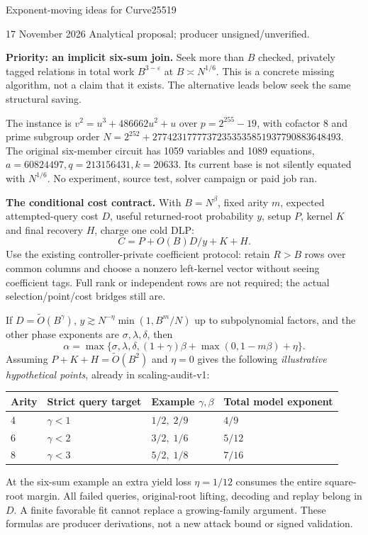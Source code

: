 \documentclass[10pt]{article}
\newcommand{\softO}{\widetilde O}
\begin{document}
{\LARGE Exponent-moving ideas for Curve25519}\par
17 November 2026 \quad Analytical proposal; producer unsigned/unverified.

\textbf{Priority: an implicit six-sum join.} Seek more than $B$ checked,
privately tagged relations in total work $B^{3-\varepsilon}$ at
$B\asymp N^{1/6}$. This is a concrete missing algorithm, not a claim that it
exists. The alternative leads below seek the same structural saving.

The instance is $v^2=u^3+486662u^2+u$ over $p=2^{255}-19$, with cofactor
8 and prime subgroup order
$N=2^{252}+27742317777372353535851937790883648493$.
The original six-member circuit has 1059 variables and 1089 equations,
$a=60824497,q=213156431,k=20633$. Its current base is not silently equated
with $N^{1/6}$. No experiment, source test, solver campaign or paid job ran.

\textbf{The conditional cost contract.} With $B=N^\beta$, fixed arity $m$,
expected attempted-query cost $D$, useful returned-root probability $y$,
setup $P$, kernel $K$ and final recovery $H$, charge one cold DLP:
\[
 C=P+O(B)D/y+K+H.
\]
Use the existing controller-private coefficient protocol: retain $R>B$
rows over common columns and choose a nonzero left-kernel vector without
seeing coefficient tags. Full rank or independent rows are not required;
the actual selection/point/cost bridges still are.

If $D=\softO(B^\gamma)$,
$y\gtrsim N^{-\eta}\min(1,B^m/N)$ up to subpolynomial factors,
and the other phase exponents are $\sigma,\lambda,\delta$, then
\[
 \alpha=\max\{\sigma,\lambda,\delta,
 (1+\gamma)\beta+\max(0,1-m\beta)+\eta\}.
\]
Assuming $P+K+H=\softO(B^2)$ and $\eta=0$ gives the following
\emph{illustrative hypothetical points}, already in scaling-audit-v1:
\begin{center}
\begin{tabular}{@{}llll@{}}
\toprule
Arity & Strict query target & Example $\gamma,\beta$ & Total model exponent\\
\midrule
4 & $\gamma<1$ & $1/2,\;2/9$ & $4/9$\\
6 & $\gamma<2$ & $3/2,\;1/6$ & $5/12$\\
8 & $\gamma<3$ & $5/2,\;1/8$ & $7/16$\\
\bottomrule
\end{tabular}
\end{center}
At the six-sum example an extra yield loss $\eta=1/12$ consumes the
entire square-root margin. All failed queries, original-root lifting,
decoding and replay belong in $D$. A finite favorable fit cannot replace a
growing-family argument. These formulas are producer derivations, not a
new attack bound or signed validation.
\end{document}

